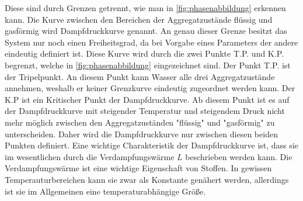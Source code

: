 Diese sind durch Grenzen
getrennt, wie man in \autoref{fig:phasenabbildung} erkennen kann. Die Kurve zwischen den Bereichen der Aggregatzustände flüssig und gasförmig wird Dampfdruckkurve genannt. An genau dieser Grenze besitzt das System
nur noch einen Freiheitsgrad, da bei Vorgabe eines Parameters der andere eindeutig definiert ist. Diese Kurve wird durch die zwei Punkte T.P. und K.P. begrenzt, welche in \autoref{fig:phasenabbildung}
eingezeichnet sind. Der Punkt T.P. ist der Tripelpunkt. An diesem Punkt kann Wasser alle drei Aggregatzustände annehmen, weshalb er keiner Grenzkurve eindeutig zugeordnet werden kann.
Der K.P ist ein Kritischer Punkt der Dampfdruckkurve. Ab diesem Punkt ist es auf der Dampfdruckkurve mit steigender Temperatur und steigendem Druck nicht mehr möglich zwischen den 
Aggregatzuständen "flüssig"\: und "gasförmig"\: zu unterscheiden. Daher wird die Dampfdruckkurve nur zwischen diesen beiden Punkten definiert. Eine wichtige Charakteristik der Dampfdruckkurve 
ist, dass sie im wesentlichen durch die Verdampfungswärme $L$ beschrieben werden kann. Die Verdampfungswärme ist eine wichtige Eigenschaft von Stoffen. In gewissen Temperauturbereichen kann sie
zwar als Konstante genähert werden, allerdings ist sie im Allgemeinen eine temperaturabhängige Größe. 

